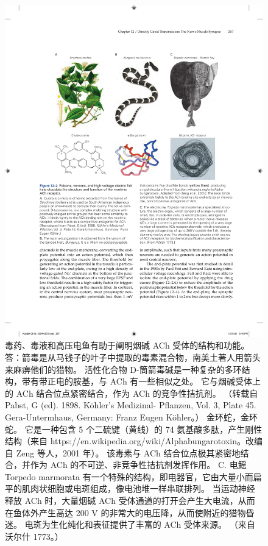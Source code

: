 \begin{figure}[htbp]
	\centering
	\includegraphics[width=0.8\linewidth]{chap12/fig_12_2}
	\caption{毒药、毒液和高压电鱼有助于阐明烟碱 ACh 受体的结构和功能。 答：箭毒是从马钱子的叶子中提取的毒素混合物，南美土著人用箭头来麻痹他们的猎物。 活性化合物 D-筒箭毒碱是一种复杂的多环结构，带有带正电的胺基，与 ACh 有一些相似之处。 它与烟碱受体上的 ACh 结合位点紧密结合，作为 ACh 的竞争性拮抗剂。 （转载自 Pabst, G (ed). 1898. Köhler's Medizinal- Pflanzen, Vol. 3, Plate 45. Gera-Untermhaus, Germany: Franz Eugen Köhler。） 金环蛇，金环蛇。 它是一种包含 5 个二硫键（黄线）的 74 氨基酸多肽，产生刚性结构（来自 https://en.wikipedia.org/wiki/Alphabungarotoxin。改编自 Zeng 等人，2001 年）。 该毒素与 ACh 结合位点极其紧密地结合，并作为 ACh 的不可逆、非竞争性拮抗剂发挥作用。 C. 电鳐 Torpedo marmorata 有一个特殊的结构，即电器官，它由大量小而扁平的肌肉状细胞或电斑组成，像电池堆一样串联排列。 当运动神经释放 ACh 时，大量烟碱 ACh 受体通道的打开会产生大电流，从而在鱼体外产生高达 200 V 的非常大的电压降，从而使附近的猎物昏迷。 电斑为生化纯化和表征提供了丰富的 ACh 受体来源。 （来自沃尔什 1773。）}
	\label{fig:12_2}
\end{figure}


